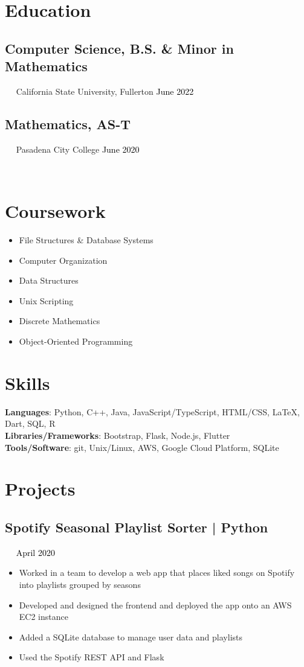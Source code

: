 \documentclass{article}
\newcommand{\resumesection}[3]{
    \subsection*{#1}
    \ 
    \ 
    \small
    \textcolor{csufgrey}{#2}
    \normalsize
    \hfill
    \textcolor{black}{#3}
    \normalsize
}
\begin{document}
\pagestyle{useheader}

\section*{Education}
\resumesection{Computer Science, B.S. \& Minor in Mathematics}{California State University, Fullerton}{June 2022}
\resumesection{Mathematics, AS-T}{Pasadena City College}{June 2020}
\\
\section*{Coursework}
\setlength{\multicolsep}{0pt}
\begin{multicols}{2}
    \noindent
    \begin{itemize}
        \item File Structures \& Database Systems
        \item Computer Organization
        \item Data Structures
        \item Unix Scripting
        \item Discrete Mathematics
        \item Object-Oriented Programming
    \end{itemize}
\end{multicols}
\hfill
\section*{Skills}
\textbf{Languages}: Python, C++, Java, JavaScript/TypeScript, HTML/CSS, {\selectfont\LaTeX}, Dart, SQL, R\\
\textbf{Libraries/Frameworks}: Bootstrap, Flask, Node.js, Flutter\\
\textbf{Tools/Software}: git, Unix/Linux, AWS, Google Cloud Platform, SQLite
\\
\section*{Projects}
\resumesection{Spotify Seasonal Playlist Sorter | Python}{}{April 2020}
\begin{itemize}
    \item Worked in a team to develop a web app that places liked songs on Spotify into playlists grouped by seasons
    \item Developed and designed the frontend and deployed the app onto an AWS EC2 instance
    \item Added a SQLite database to manage user data and playlists
    \item Used the Spotify REST API and Flask
\end{itemize}
\end{document}
